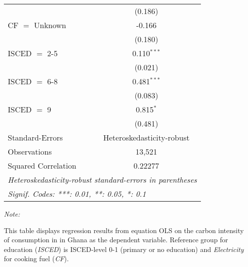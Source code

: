 \begin{table}[htbp!]
\begin{adjustbox}{width = 1\textwidth, max height = 0.95\textheight, center}
\begin{threeparttable}[b]
\begin{tabular}{lc}
                                & (0.186)\\   
            CF $=$ Unknown      & -0.166\\   
                                & (0.180)\\   
            ISCED $=$ 2-5       & 0.110$^{***}$\\   
                                & (0.021)\\   
            ISCED $=$ 6-8       & 0.481$^{***}$\\   
                                & (0.083)\\   
            ISCED $=$ 9         & 0.815$^{*}$\\   
                                & (0.481)\\   
            \midrule 
            Standard-Errors     & Heteroskedasticity-robust \\   
            Observations        & 13,521\\  
            Squared Correlation & 0.22277\\  
            \midrule \midrule
            \multicolumn{2}{l}{\emph{Heteroskedasticity-robust standard-errors in parentheses}}\\
            \multicolumn{2}{l}{\emph{Signif. Codes: ***: 0.01, **: 0.05, *: 0.1}}\\
         \end{tabular}
         
         \begin{tablenotes}\item \medskip \textit{Note:}
            \item This table displays regression results from equation OLS on the carbon intensity of consumption in  in Ghana as the dependent variable. Reference group for education (\textit{ISCED}) is ISCED-level 0-1 (primary or no education) and \textit{Electricity} for cooking fuel (\textit{CF}).
         \end{tablenotes}
      \end{threeparttable}
   \end{adjustbox}
\end{table}


